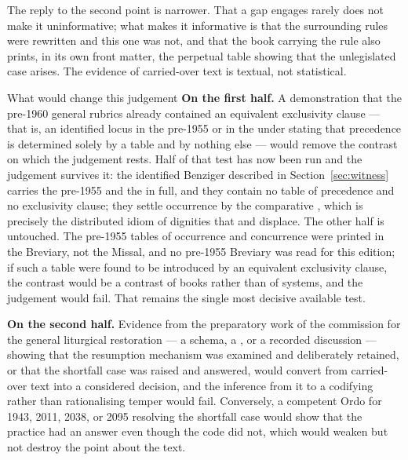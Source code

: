 The reply to the second point is narrower. That a gap engages rarely does not make it
uninformative; what makes it informative is that the surrounding rules were rewritten and this
one was not, and that the book carrying the rule also prints, in its own front matter, the perpetual
table showing that the unlegislated case arises. The evidence of carried-over text is textual,
not statistical.

\begin{studybox}{What would change this judgement}
\textbf{On the first half.} A demonstration that the pre-1960 general rubrics already contained
an equivalent exclusivity clause — that is, an identified locus in the pre-1955  or in the  under
 stating that precedence is determined solely by a table and by nothing
else — would remove the contrast on which the judgement rests. Half of that test has now been
run and the judgement survives it: the identified Benziger  described in Section~\ref{sec:witness} carries the pre-1955  and the  in full, and they contain no table of
precedence and no exclusivity clause; they settle occurrence by the comparative
, which is precisely the distributed idiom of dignities that  and
 displace. The other half is untouched. The pre-1955 tables of occurrence and concurrence
were printed in the Breviary, not the Missal, and no pre-1955 Breviary was read for this
edition; if such a table were found to be introduced by an equivalent exclusivity clause, the
contrast would be a contrast of books rather than of systems, and the judgement would fail. That
remains the single most decisive available test.

\textbf{On the second half.} Evidence from the preparatory work of the commission for the
general liturgical restoration — a schema, a , or a recorded discussion — showing
that the resumption mechanism was examined and deliberately retained, or that the shortfall case
was raised and answered, would convert  from carried-over text into a considered
decision, and the inference from it to a codifying rather than rationalising temper would fail.
Conversely, a competent Ordo for 1943, 2011, 2038, or 2095 resolving the shortfall case would
show that the practice had an answer even though the code did not, which would weaken but not
destroy the point about the text.
\end{studybox}
